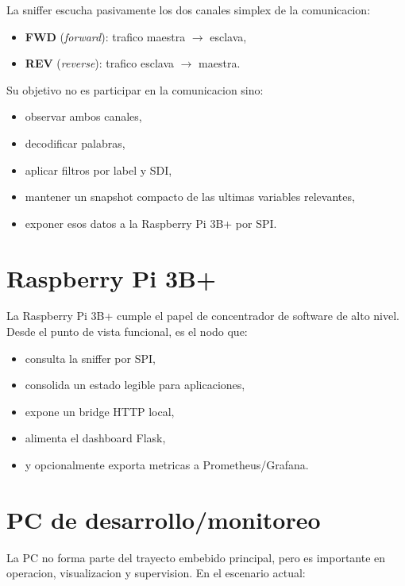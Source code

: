 \documentclass[12pt,a4paper]{report}
\begin{document}
La sniffer escucha pasivamente los dos canales simplex de la comunicacion:

\begin{itemize}
    \item \textbf{FWD} (\emph{forward}): trafico maestra $\rightarrow$ esclava,
    \item \textbf{REV} (\emph{reverse}): trafico esclava $\rightarrow$ maestra.
\end{itemize}

Su objetivo no es participar en la comunicacion sino:

\begin{itemize}
    \item observar ambos canales,
    \item decodificar palabras,
    \item aplicar filtros por label y SDI,
    \item mantener un snapshot compacto de las ultimas variables relevantes,
    \item exponer esos datos a la Raspberry Pi 3B+ por SPI.
\end{itemize}

\section{Raspberry Pi 3B+}

La Raspberry Pi 3B+ cumple el papel de concentrador de software de alto nivel. Desde el punto de vista funcional, es el nodo que:

\begin{itemize}
    \item consulta la sniffer por SPI,
    \item consolida un estado legible para aplicaciones,
    \item expone un bridge HTTP local,
    \item alimenta el dashboard Flask,
    \item y opcionalmente exporta metricas a Prometheus/Grafana.
\end{itemize}

\section{PC de desarrollo/monitoreo}

La PC no forma parte del trayecto embebido principal, pero es importante en operacion, visualizacion y supervision. En el escenario actual:
\end{document}
